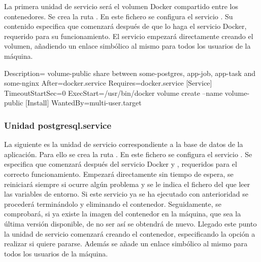 La primera unidad de servicio será el volumen Docker compartido entre los contenedores. Se crea la ruta . En este fichero se configura el servicio . Su contenido especifica que comenzará después de que lo haga el servicio Docker, requerido para su funcionamiento. El servicio empezará directamente creando el volumen, añadiendo un enlace simbólico al mismo para todos los usuarios de la máquina. 

\begin{codelisting}
\label{code:volume-public.service}
\begin{code}
[Unit] 
  Description= volume-public share between some-postgres, app-job, app-task and 
               some-nginx 
  After=docker.service
  Requires=docker.service
[Service] 
  TimeoutStartSec=0 
  ExecStart=/usr/bin/docker volume create --name volume-public
[Install] 
  WantedBy=multi-user.target
\end{code}
\end{codelisting}

\subsubsection{Unidad postgresql.service}

La siguiente es la unidad de servicio correspondiente a la base de datos de la aplicación. Para ello se crea la ruta . En este fichero se configura el servicio . Se especifica que comenzará después del servicio Docker y , requeridos para el correcto funcionamiento. Empezará directamente sin tiempo de espera, se reiniciará siempre si ocurre algún problema y se le indica el fichero del que leer las variables de entorno. Si este servicio ya se ha ejecutado con anterioridad se procederá terminándolo y eliminando el contenedor. Seguidamente, se comprobará, si ya existe la imagen del contenedor en la máquina, que sea la última versión disponible, de no ser así se obtendrá de nuevo. Llegado este punto la unidad de servicio comenzará creando el contenedor, especificando la opción a realizar si quiere pararse. Además se añade un enlace simbólico al mismo para todos los usuarios de la máquina. 

